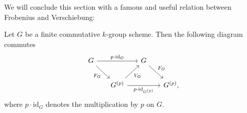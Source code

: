 \documentclass[../Main]{subfiles}
\begin{document}
We will conclude this section with a famous and useful relation between
Frobenius and Verschiebung:
\begin{thm}[]\label{thm:FrobeniusVerschiebungRelation}
	Let $G$ be a finite commutative $k$-group scheme. Then the following
	diagram commutes
	\begin{equation}
	\begin{tikzcd}[column sep=1.5em]
		G \arrow[rr, "p \cdot \mathrm{id}_{ G }", rightarrow] 
		\arrow[rd, "F_G"', rightarrow] & &
		G \arrow[rd, "F_G", rightarrow] & \\
		&
		G^{(p)} \arrow[ru, "V_G"', rightarrow] 
		\arrow[rr, "p \cdot \mathrm{id}_{ G^{(p)} }"', rightarrow] & &
		G^{(p)}
	,\end{tikzcd}
	\end{equation}
	where $p \cdot \mathrm{id}_{ G }$ denotes the multiplication by $p$
	on $G$.
\end{thm}
\end{document}
